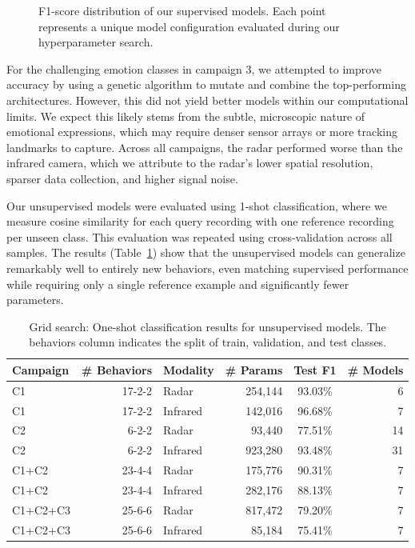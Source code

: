 \documentclass{article}
\begin{document}
\begin{figure}[!t]
    \centering
    
    \caption{F1-score distribution of our supervised models. Each point represents a unique model configuration evaluated during our hyperparameter search.}
    \label{fig:f1_scatter_plot}
\end{figure}

For the challenging emotion classes in campaign 3, we attempted to improve accuracy by using a genetic algorithm to mutate and combine the top-performing architectures. However, this did not yield better models within our computational limits. We expect this likely stems from the subtle, microscopic nature of emotional expressions, which may require denser sensor arrays or more tracking landmarks to capture. Across all campaigns, the radar performed worse than the infrared camera, which we attribute to the radar's lower spatial resolution, sparser data collection, and higher signal noise.

Our unsupervised models were evaluated using 1-shot classification, where we measure cosine similarity for each query recording with one reference recording per unseen class. This evaluation was repeated using cross-validation across all samples. The results (Table~\ref{tab:unsupervised_results}) show that the unsupervised models can generalize remarkably well to entirely new behaviors, even matching supervised performance while requiring only a single reference example and significantly fewer parameters.

\begin{table}[!t]
\centering
\small
\setlength{\tabcolsep}{2pt}
\begin{tabular}{l r l r c r}
\toprule
\textbf{Campaign} & \textbf{\# Behaviors} & \textbf{Modality} & \textbf{\# Params} & \textbf{Test F1} & \textbf{\# Models} \\
\midrule
C1       & 17-2-2 & Radar    &   254,144 & 93.03\% &  6 \\
C1       & 17-2-2 & Infrared &   142,016 & 96.68\% &  7 \\
C2       &  6-2-2 & Radar    &    93,440 & 77.51\% & 14 \\
C2       &  6-2-2 & Infrared &   923,280 & 93.48\% & 31 \\
\hline
C1+C2    & 23-4-4 & Radar    &   175,776 & 90.31\% &  7 \\
C1+C2    & 23-4-4 & Infrared &   282,176 & 88.13\% &  7 \\
C1+C2+C3 & 25-6-6 & Radar    &   817,472 & 79.20\% &  7 \\
C1+C2+C3 & 25-6-6 & Infrared &    85,184 & 75.41\% &  7 \\
\bottomrule
\end{tabular}
\caption{Grid search: One-shot classification results for unsupervised models. The behaviors column indicates the split of train, validation, and test classes.}
\label{tab:unsupervised_results}
\end{table}
\end{document}
